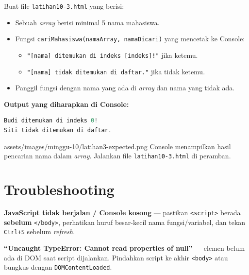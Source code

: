 \begin{latihan}
Buat file \texttt{latihan10-3.html} yang berisi:
\begin{itemize}
  \item Sebuah \emph{array} berisi minimal 5 nama mahasiswa.
  \item Fungsi \texttt{cariMahasiswa(namaArray, namaDicari)} yang mencetak ke Console:
  \begin{itemize}
    \item \texttt{"[nama] ditemukan di indeks [indeks]!"} jika ketemu.
    \item \texttt{"[nama] tidak ditemukan di daftar."} jika tidak ketemu.
  \end{itemize}
  \item Panggil fungsi dengan nama yang ada di \emph{array} dan nama yang tidak ada.
\end{itemize}

\textbf{Output yang diharapkan di Console:}
\begin{lstlisting}[language=JavaScript]
Budi ditemukan di indeks 0!
Siti tidak ditemukan di daftar.
\end{lstlisting}

\begin{tangkapanlayar}
  {assets/images/minggu-10/latihan3-expected.png}
  {Console menampilkan hasil pencarian nama dalam \emph{array}.}
  {Jalankan file \texttt{latihan10-3.html} di peramban.}
\end{tangkapanlayar}
\end{latihan}

\section{Troubleshooting}
\label{sec:10-troubleshooting}

\begin{peringatan}
\textbf{JavaScript tidak berjalan / Console kosong} --- pastikan \texttt{<script>} berada \textbf{sebelum} \texttt{</body>}, perhatikan huruf besar-kecil nama fungsi/variabel, dan tekan \texttt{Ctrl+S} sebelum \emph{refresh}.
\end{peringatan}

\begin{catatan}
\textbf{``Uncaught TypeError: Cannot read properties of null''} --- elemen belum ada di DOM saat script dijalankan. Pindahkan script ke akhir \texttt{<body>} atau bungkus dengan \texttt{DOMContentLoaded}.
\end{catatan}

